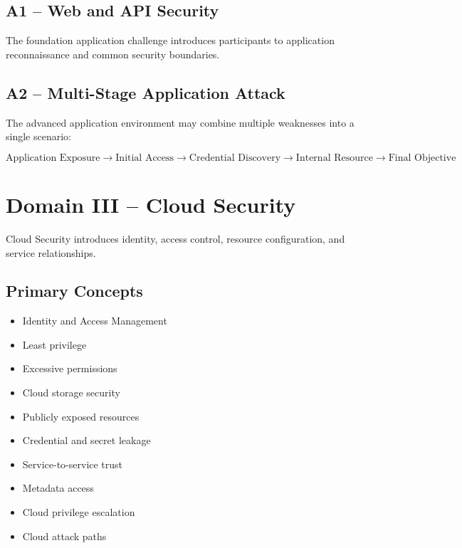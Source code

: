 \documentclass[11pt,a4paper]{article}
\begin{document}
\subsection{A1 -- Web and API Security}

The foundation application challenge introduces participants to
application reconnaissance and common security boundaries.


\subsection{A2 -- Multi-Stage Application Attack}

The advanced application environment may combine multiple weaknesses
into a single scenario:

\[
\text{Application Exposure}
\rightarrow
\text{Initial Access}
\rightarrow
\text{Credential Discovery}
\rightarrow
\text{Internal Resource}
\rightarrow
\text{Final Objective}
\]



\section{Domain III -- Cloud Security}

Cloud Security introduces identity, access control, resource
configuration, and service relationships.


\subsection{Primary Concepts}

\begin{itemize}

    \item Identity and Access Management
    \item Least privilege
    \item Excessive permissions
    \item Cloud storage security
    \item Publicly exposed resources
    \item Credential and secret leakage
    \item Service-to-service trust
    \item Metadata access
    \item Cloud privilege escalation
    \item Cloud attack paths

\end{itemize}
\end{document}
